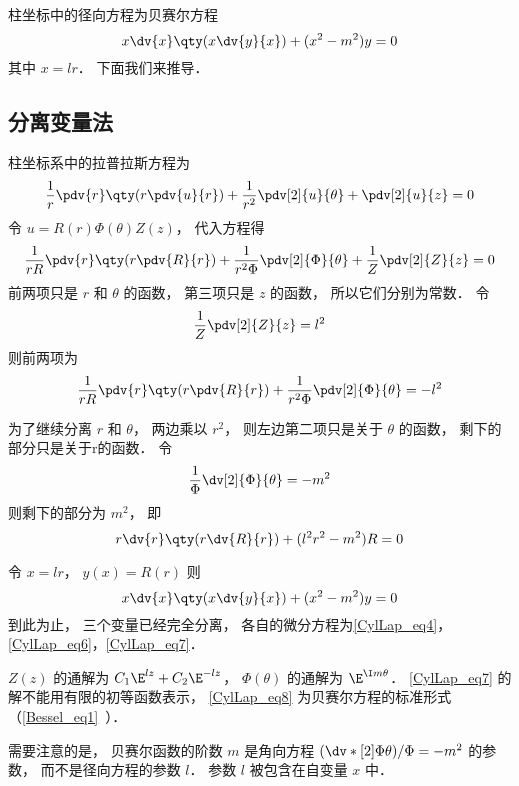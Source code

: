 

柱坐标中的径向方程为贝赛尔方程
\begin{equation}
x \dv{x} \qty(x \dv{y}{x}) + (x^2 - m^2)y = 0
\end{equation}
其中 $x = lr$． 下面我们来推导．

\subsection{分离变量法}
柱坐标系中的拉普拉斯方程为
\begin{equation}
\frac{1}{r} \pdv{r} \qty(r\pdv{u}{r}) + \frac{1}{r^2} \pdv[2]{u}{\theta} + \pdv[2]{u}{z} = 0
\end{equation}
令 $u = R(r) \Phi(\theta) Z(z)$， 代入方程得
\begin{equation}
\frac{1}{rR}\pdv{r} \qty(r\pdv{R}{r}) + \frac{1}{r^2 \Phi} \pdv[2]{\Phi}{\theta} + \frac{1}{Z} \pdv[2]{Z}{z} = 0
\end{equation}
前两项只是 $r$ 和 $\theta $ 的函数， 第三项只是 $z$ 的函数， 所以它们分别为常数． 令
\begin{equation}\label{CylLap_eq4}
\frac{1}{Z} \pdv[2]{Z}{z} = l^2
\end{equation}
则前两项为
\begin{equation}
\frac{1}{rR} \pdv{r} \qty(r\pdv{R}{r}) + \frac{1}{r^2 \Phi} \pdv[2]{\Phi}{\theta} =  - l^2
\end{equation}

为了继续分离 $r$ 和 $\theta$， 两边乘以 $r^2$，   则左边第二项只是关于 $\theta$  的函数， 剩下的部分只是关于r的函数． 令
\begin{equation}\label{CylLap_eq6}
\frac{1}{\Phi } \dv[2]{\Phi}{\theta} = -m^2
\end{equation}
则剩下的部分为 $m^2$， 即
\begin{equation}\label{CylLap_eq7}
r \dv{r} \qty(r\dv{R}{r}) + (l^2 r^2 - m^2)R = 0
\end{equation}

令 $x = lr$，   $y(x) = R(r)$ 则
\begin{equation}\label{CylLap_eq8} 
x \dv{x} \qty(x\dv{y}{x}) + (x^2 - m^2)y = 0
\end{equation}
到此为止， 三个变量已经完全分离， 各自的微分方程为\autoref{CylLap_eq4}， \autoref{CylLap_eq6}，\autoref{CylLap_eq7}．

$Z(z)$ 的通解为 $C_1\E^{lz} + C_2 \E^{-lz}$，   $\Phi(\theta)$ 的通解为 $\E^{\I m\theta}$．   \autoref{CylLap_eq7} 的解不能用有限的初等函数表示， \autoref{CylLap_eq8} 为贝赛尔方程的标准形式（\autoref{Bessel_eq1}~）．

需要注意的是， 贝赛尔函数的阶数 $m$ 是角向方程 $(\dv*[2]{\Phi}{\theta})/\Phi = -m^2$ 的参数， 而不是径向方程的参数 $l$． 参数 $l$ 被包含在自变量 $x$ 中．
 
